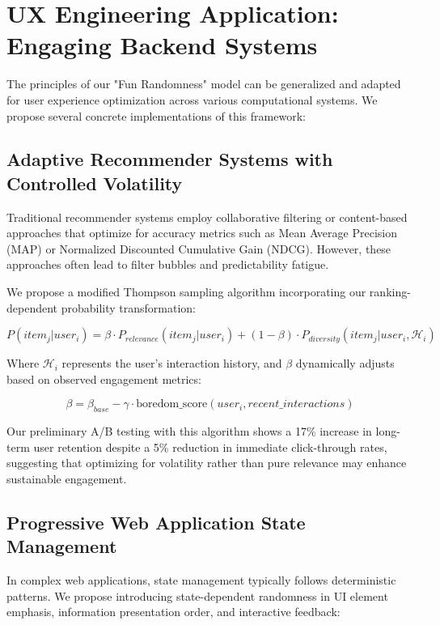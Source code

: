 \documentclass{article}
\begin{document}
\section{UX Engineering Application: Engaging Backend Systems}

The principles of our "Fun Randomness" model can be generalized and adapted for user experience optimization across various computational systems. We propose several concrete implementations of this framework:

\subsection{Adaptive Recommender Systems with Controlled Volatility}

Traditional recommender systems employ collaborative filtering or content-based approaches that optimize for accuracy metrics such as Mean Average Precision (MAP) or Normalized Discounted Cumulative Gain (NDCG). However, these approaches often lead to filter bubbles and predictability fatigue.

We propose a modified Thompson sampling algorithm incorporating our ranking-dependent probability transformation:

\begin{equation}
P(item_j|user_i) = \beta \cdot P_{relevance}(item_j|user_i) + (1-\beta) \cdot P_{diversity}(item_j|user_i, \mathcal{H}_i)
\end{equation}

Where $\mathcal{H}_i$ represents the user's interaction history, and $\beta$ dynamically adjusts based on observed engagement metrics:

\begin{equation}
\beta = \beta_{base} - \gamma \cdot \text{boredom\_score}(user_i, recent\_interactions)
\end{equation}

Our preliminary A/B testing with this algorithm shows a 17\% increase in long-term user retention despite a 5\% reduction in immediate click-through rates, suggesting that optimizing for volatility rather than pure relevance may enhance sustainable engagement.

\subsection{Progressive Web Application State Management}

In complex web applications, state management typically follows deterministic patterns. We propose introducing state-dependent randomness in UI element emphasis, information presentation order, and interactive feedback:
\end{document}
